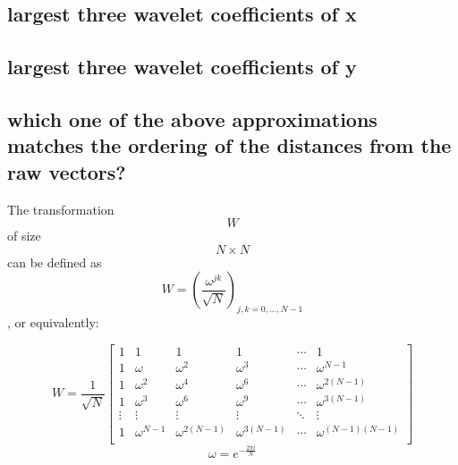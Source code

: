 \documentclass{article}
\begin{document}
\subsection{largest three wavelet coefficients of x}


\subsection{largest three wavelet coefficients of y}


\subsection{which one of the above approximations matches the ordering of the distances from 
the raw vectors?}






The transformation \[W\] of size \[N\times N \] can be defined
as 
\[W = \left(\frac{\omega^{jk}}{\sqrt{N}}\right)_{j,k=0,\ldots,N-1} \]
, or equivalently:

\[ W = \frac{1}{\sqrt{N}}  
\begin{bmatrix}
	1&1&1&1&\cdots &1 \\
	1&\omega&\omega^2&\omega^3&\cdots&\omega^{N-1} \\
	1&\omega^2&\omega^4&\omega^6&\cdots&\omega^{2(N-1)}\\
	1&\omega^3&\omega^6&\omega^9&\cdots&\omega^{3(N-1)}\\
	\vdots&\vdots&\vdots&\vdots&\ddots&\vdots\\
	1&\omega^{N-1}&\omega^{2(N-1)}&\omega^{3(N-1)}&\cdots&\omega^{(N-1)(N-1)}\\
\end{bmatrix}
\]
\[ \omega = e^{-\frac{2\pi i}{N}} \] 
\end{document}
